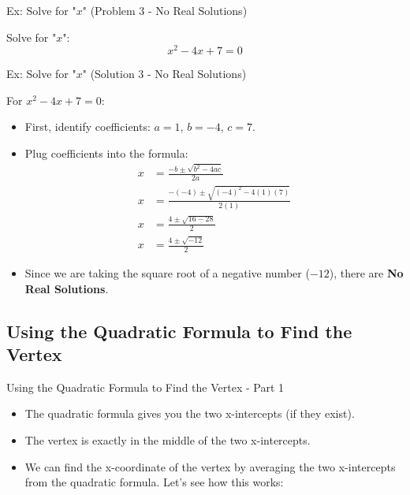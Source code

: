 \documentclass[aspectratio=169]{beamer}
\begin{document}
\begin{frame}{Ex: Solve for "$x$" (Problem 3 - No Real Solutions)}
    \begin{tcolorbox}[colback=lightgray,colframe=primary,title=Problem 3]
        \footnotesize
        Solve for "$x$":
        \[ x^2 - 4x + 7 = 0 \]
    \end{tcolorbox}
\end{frame}

\begin{frame}{Ex: Solve for "$x$" (Solution 3 - No Real Solutions)}
    \begin{tcolorbox}[colback=lightgray,colframe=accent,title=Solution 3]
        \footnotesize
        For $x^2 - 4x + 7 = 0$:
        \begin{itemize}
            \item First, identify coefficients: $a=1$, $b=-4$, $c=7$.
            \item Plug coefficients into the formula:
                \begin{align*}
                    x &= \frac{-b \pm \sqrt{b^2 - 4ac}}{2a} \\
                    x &= \frac{-(-4) \pm \sqrt{(-4)^2 - 4(1)(7)}}{2(1)} \\
                    x &= \frac{4 \pm \sqrt{16 - 28}}{2} \\
                    x &= \frac{4 \pm \sqrt{-12}}{2}
                \end{align*}
            \item Since we are taking the square root of a negative number ($-12$), there are \textbf{No Real Solutions}.
        \end{itemize}
    \end{tcolorbox}
\end{frame}

\subsection{Using the Quadratic Formula to Find the Vertex}

\begin{frame}{Using the Quadratic Formula to Find the Vertex - Part 1}
    \begin{tcolorbox}[colback=lightgray,colframe=primary,title=Key Ideas]
        \footnotesize
        \begin{itemize}
            \item The quadratic formula gives you the two x-intercepts (if they exist).
            \item The vertex is exactly in the middle of the two x-intercepts.
            \item We can find the x-coordinate of the vertex by averaging the two x-intercepts from the quadratic formula. Let's see how this works:
        \end{itemize}
    \end{tcolorbox}
\end{frame}
\end{document}

